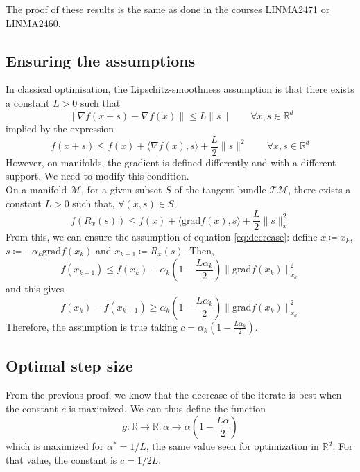 \documentclass[12pt, openany]{report}
\newcommand{\R}{\mathbb{R}}
\newcommand{\M}{\mathcal{M}}
\theoremstyle{definition}
\begin{document}
The proof of these results is the same as done in the courses LINMA2471 or LINMA2460. \\

\subsection{Ensuring the assumptions}
In classical optimisation, the Lipschitz-smoothness assumption is that there exists a constant $L>0$ such that 
\begin{equation}
	\|\nabla f(x+s)-\nabla f(x)\| \le L\|s\| \qquad \forall x,s\in \R^d 
\end{equation}
implied by the expression 
\begin{equation}
	f(x+s) \le f(x) + \langle \nabla f(x),s\rangle  + \frac{L}{2}\|s\|^2 \qquad \forall x,s\in \R^d
\end{equation}
However, on manifolds, the gradient is defined differently and with a different support. We need to modify this condition. \\
On a manifold $\M$, for a given subset $S$ of the tangent bundle $\mathcal{TM}$, there exists a constant $L>0$ such that, $\forall (x,s)\in S$, 
\begin{equation}
	f(R_x(s)) \le f(x) + \langle \text{grad} f(x),s\rangle + \frac{L}{2}\|s\|_x^2
\end{equation}
From this, we can ensure the assumption of equation \eqref{eq:decrease}: define $x\coloneqq x_k$, $s\coloneqq -\alpha_k \text{grad}f(x_k)$ and $x_{k+1} \coloneqq R_x(s)$. Then,
\begin{equation}
	f(x_{k+1}) \le f(x_k) - \alpha_k\left(1-\frac{L\alpha_k}{2}\right) \| \text{grad}f(x_k)\|_{x_k}^2
\end{equation}
and this gives 
\begin{equation}
	f(x_k) - f(x_{k+1}) \ge \alpha_k \left(1-\frac{L\alpha_k}{2}\right) \| \text{grad} f(x_k)\|_{x_k}^2 
\end{equation}
Therefore, the assumption is true taking $c = \alpha_k \left(1-\frac{L\alpha_k}{2}\right)$.
\subsection{Optimal step size}
From the previous proof, we know that the decrease of the iterate is best when the constant $c$ is maximized. We can thus define the function 
\begin{equation}
	g:\R\to \R : \alpha \to \alpha \left(1-\frac{L\alpha}{2}\right)
\end{equation}
which is maximized for $\alpha^* = 1/L$, the same value seen for optimization in $\R^d$. For that value, the constant is $c=1/2L$.
\end{document}
